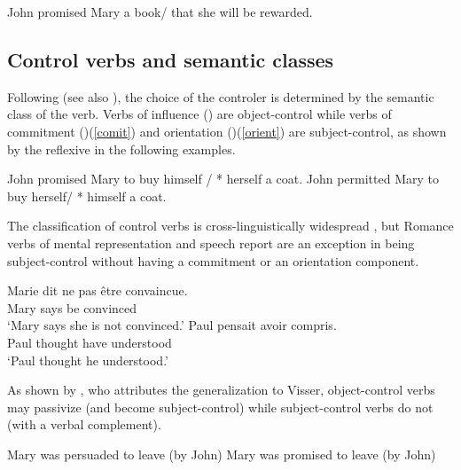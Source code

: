 \documentclass[output=paper]{langsci/langscibook}
\begin{document}
\begin{exe}
	\ex John promised Mary a book/ that she will be rewarded.
\end{exe}
 
\subsection{Control verbs and semantic classes}

Following \citet{PollardandSag1992} (see also \citealt{JackendoffandCulicover2003}), the choice of the controler is determined by the semantic class of the verb.  Verbs of influence () are object-control
while verbs of commitment ()(\ref{comit}) and orientation ()(\ref{orient}) are subject-control, as shown by the reflexive in the following examples.

\begin{exe}
	\ex \begin{xlist}
	\ex John promised Mary to buy himself / * herself a coat. \label{comit}
   \ex 	John permitted Mary to buy herself/ * himself a coat.\label{orient}
 \end{xlist}
 \end{exe}
 
  The classification of control verbs is cross-linguistically widespread \citep{VanValinandLapolla1997}, but Romance verbs of mental representation and speech report are an exception in being subject-control without having a commitment or an orientation component.


\begin{exe}
\ex \begin{xlist}
\ex \gll Marie dit {ne pas} \^etre convaincue. \\
Mary says  be convinced \\
\glt `Mary says she is not convinced.'	
\ex \gll Paul pensait  avoir compris. \\
Paul thought have understood \\
\glt `Paul thought he understood.'
 \end{xlist}
\end{exe}

As shown by \citet{Bresnan1982}, who attributes the generalization to Visser, object-control verbs may passivize (and become subject-control) while   subject-control verbs do not (with a verbal complement).
\begin{exe}
	\ex \begin{xlist}
	\ex Mary was persuaded to leave (by John)
\ex * Mary was promised to leave (by John)
\end{xlist}
 \end{exe}
 
\end{document}
